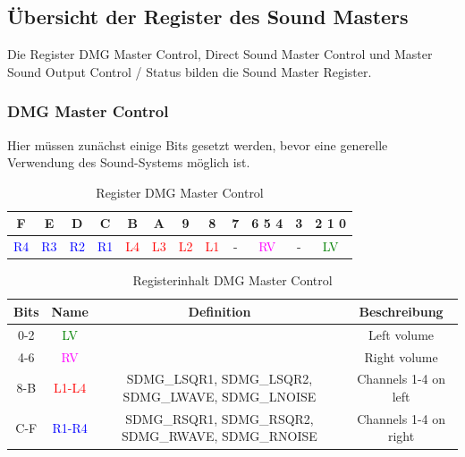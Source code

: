 \documentclass[11pt,a4paper]{scrartcl}
\begin{document}
\subsection{\"Ubersicht der Register des Sound Masters}

Die Register DMG Master Control, Direct Sound Master Control und Master Sound Output Control / Status bilden die Sound Master Register.\\


\subsubsection{DMG Master Control} \label{dmgmastercontrol}

Hier m\"ussen zun\"achst einige Bits gesetzt werden, bevor eine generelle Verwendung des Sound-Systems m\"oglich ist.\\

\begin{table}[h]
	\centering
	\begin{tabular}{| c | c | c | c | c | c | c | c | c | c | c | c |}
	    \hline
	    F & E & D & C & B & A & 9 & 8 & 7 & 6 5 4 & 3 & 2 1 0 \\
	    \hline
	    \textcolor{blue}{R4} & \textcolor{blue}{R3} & \textcolor{blue}{R2} & \textcolor{blue}{R1} & \textcolor{red}{L4} & \textcolor{red}{L3}
	& \textcolor{red}{L2} & \textcolor{red}{L1} & - & \textcolor{magenta}{RV} & - & \textcolor{green}{LV} \\
	    \hline
	\end{tabular}
	\caption{Register DMG Master Control}
	\label{table: DMGMasterControl}
\end{table}
	
\begin{table}[h]
	\centering
	\begin{tabular}{| c | c | c | c |}
	    \hline
	    \textbf{Bits} & \textbf{Name} & \textbf{Definition} & \textbf{Beschreibung} \\
	    \hline
	    0-2 & \textcolor{green}{LV} & & Left volume \\
	    \hline
	    4-6 & \textcolor{magenta}{RV} & & Right volume \\
	    \hline
	    8-B & \textcolor{red}{L1-L4} & SDMG\_LSQR1, SDMG\_LSQR2, SDMG\_LWAVE, SDMG\_LNOISE  & Channels 1-4 on left \\
	    \hline
	    C-F & \textcolor{blue}{R1-R4} & SDMG\_RSQR1, SDMG\_RSQR2, SDMG\_RWAVE, SDMG\_RNOISE  & Channels 1-4 on right \\
	    \hline
	\end{tabular}
	\caption{Registerinhalt DMG Master Control}
	\label{table: DMGMasterControlContent}
\end{table}
\end{document}
